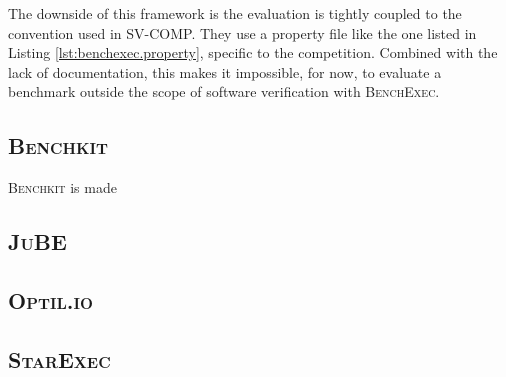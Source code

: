 The downside of this framework is the evaluation is tightly coupled to the convention used in SV-COMP. They use a property file like the one listed in Listing \ref{lst:benchexec.property}, specific to the competition. Combined with the lack of documentation, this makes it impossible, for now, to evaluate a benchmark outside the scope of software verification with \textsc{BenchExec}.


\subsection{\textsc{Benchkit}}

\textsc{Benchkit} is made

\subsection{\textsc{JuBE}}

\subsection{\textsc{Optil.io}}

\subsection{\textsc{StarExec}}
